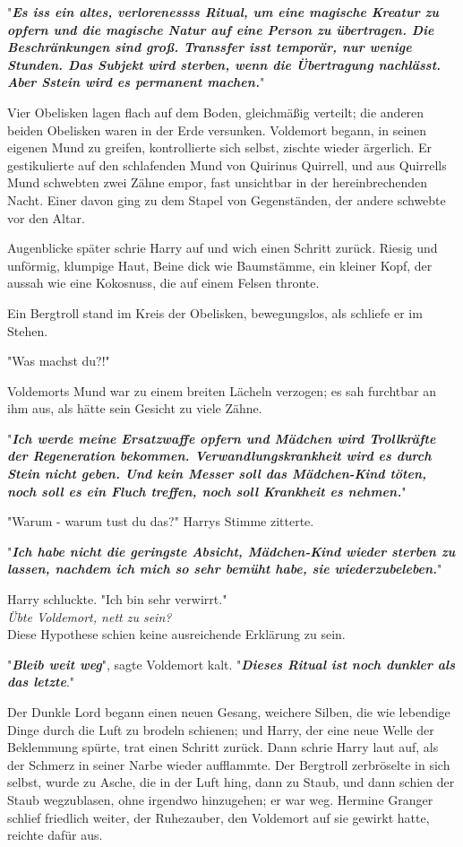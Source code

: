 {"\textbf{\emph{Es iss ein altes, verlorenessss Ritual, um eine magische Kreatur zu opfern und die magische Natur auf eine Person zu übertragen. Die Beschränkungen sind groß. Transsfer isst temporär, nur wenige Stunden. Das Subjekt wird sterben, wenn die Übertragung nachlässt. Aber Sstein wird es permanent machen.}}"

Vier Obelisken lagen flach auf dem Boden, gleichmäßig verteilt; die anderen beiden Obelisken waren in der Erde versunken. Voldemort begann, in seinen eigenen Mund zu greifen, kontrollierte sich selbst, zischte wieder ärgerlich. Er gestikulierte auf den schlafenden Mund von Quirinus Quirrell, und aus Quirrells Mund schwebten zwei Zähne empor, fast unsichtbar in der hereinbrechenden Nacht. Einer davon ging zu dem Stapel von Gegenständen, der andere schwebte vor den Altar.

Augenblicke später schrie Harry auf und wich einen Schritt zurück. Riesig und unförmig, klumpige Haut, Beine dick wie Baumstämme, ein kleiner Kopf, der aussah wie eine Kokosnuss, die auf einem Felsen thronte.

Ein Bergtroll stand im Kreis der Obelisken, bewegungslos, als schliefe er im Stehen.

"Was machst du?!"

Voldemorts Mund war zu einem breiten Lächeln verzogen; es sah furchtbar an ihm aus, als hätte sein Gesicht zu viele Zähne.

"\textbf{\emph{Ich werde meine Ersatzwaffe opfern und Mädchen wird Trollkräfte der Regeneration bekommen. Verwandlungskrankheit wird es durch Stein nicht geben. Und kein Messer soll das Mädchen-Kind töten, noch soll es ein Fluch treffen, noch soll Krankheit es nehmen.}}"

"Warum - warum tust du das?" Harrys Stimme zitterte.

"\textbf{\emph{Ich habe nicht die geringste Absicht, Mädchen-Kind wieder sterben zu lassen, nachdem ich mich so sehr bemüht habe, sie wiederzubeleben.}}"

Harry schluckte. "Ich bin sehr verwirrt."\\ \emph{Übte Voldemort, nett zu sein?}\\ Diese Hypothese schien keine ausreichende Erklärung zu sein.

"\textbf{\emph{Bleib weit weg}}", sagte Voldemort kalt. "\textbf{\emph{Dieses Ritual ist noch dunkler als das letzte}}."

Der Dunkle Lord begann einen neuen Gesang, weichere Silben, die wie lebendige Dinge durch die Luft zu brodeln schienen; und Harry, der eine neue Welle der Beklemmung spürte, trat einen Schritt zurück. Dann schrie Harry laut auf, als der Schmerz in seiner Narbe wieder aufflammte. Der Bergtroll zerbröselte in sich selbst, wurde zu Asche, die in der Luft hing, dann zu Staub, und dann schien der Staub wegzublasen, ohne irgendwo hinzugehen; er war weg. Hermine Granger schlief friedlich weiter, der Ruhezauber, den Voldemort auf sie gewirkt hatte, reichte dafür aus.

}
